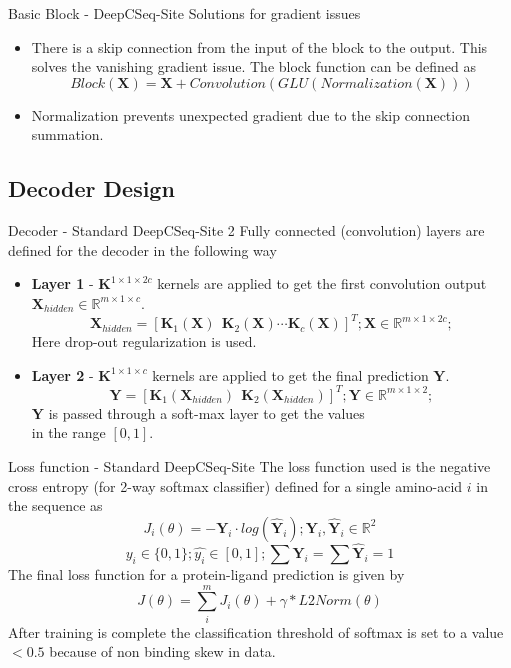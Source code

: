 \documentclass{beamer}
\begin{document}
\begin{frame}[t]{Basic Block - DeepCSeq-Site}
Solutions for gradient issues
\begin{itemize}
\item There is a skip connection from the input of the block to the output.
This solves the vanishing gradient issue. The block function can be defined as
$$
Block(\mathbf{X}) = \mathbf{X} + Convolution( GLU( Normalization(\mathbf{X}) ) )
$$

\item Normalization prevents unexpected gradient due to the skip connection summation.
\end{itemize}
\end{frame}

\subsection{Decoder Design}

\begin{frame}[t]{Decoder - Standard DeepCSeq-Site}
2 Fully connected (convolution) layers are defined for the decoder in the following way 
\begin{itemize}
\item \textbf{Layer 1} - $\mathbf{K}^{1 \times 1 \times 2c}$ kernels are applied to get the first convolution output $\mathbf{X}_{hidden} \in \mathbb{R}^{m \times 1 \times c}$.
$$
\mathbf{X}_{hidden} = [\mathbf{K}_1(\mathbf{X})\:\: \mathbf{K}_2(\mathbf{X}) \cdots  
\mathbf{K}_c(\mathbf{X})]^T;
\mathbf{X} \in \mathbb{R}^{m \times 1 \times 2c};
$$
Here drop-out regularization is used.

\item \textbf{Layer 2} - $\mathbf{K}^{1 \times 1 \times c}$ kernels are applied to get the final prediction $\mathbf{Y}$.
$$
\mathbf{Y} = [\mathbf{K}_1(\mathbf{X}_{hidden})\:\:
\mathbf{K}_2(\mathbf{X}_{hidden})]^T;
\mathbf{Y} \in \mathbb{R}^{m \times 1 \times 2};
$$
$\mathbf{Y}$ is passed through a soft-max layer to get the values\\
in the range $[0,1]$. 
\end{itemize}
\end{frame}

\begin{frame}[t]{Loss function - Standard DeepCSeq-Site}
The loss function used is the negative cross entropy (for 2-way softmax classifier) defined for a single amino-acid $i$ in the sequence as 
$$
J_i(\theta) = - \mathbf{Y}_i \cdot log(\hat{\mathbf{Y}}_i);
\mathbf{Y}_i , \hat{\mathbf{Y}}_i \in \mathbb{R}^2
$$
$$
y_i \in \{0,1\};
\hat{y_i} \in [0,1];
\sum \mathbf{Y}_i = \sum \hat{\mathbf{Y}}_i = 1
$$
The final loss function for a protein-ligand prediction is given by
$$
J(\theta) = \sum_{i}^{m} J_i(\theta) + \gamma * L2Norm(\theta)
$$
After training is complete the classification threshold of softmax is set to a value $< 0.5$ because of non binding skew in data.
\end{frame}
\end{document}
